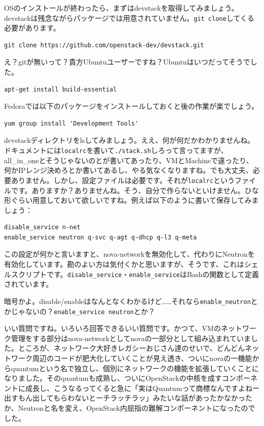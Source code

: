\documentclass[9pt,b5paper,tombo,openany,dvipdfmx]{jsbook}
\begin{document}
OSのインストールが終わったら、まずはdevstackを取得してみましょう。devstackは残念ながらパッケージでは用意されていません。\verb|git clone|してくる必要があります。

\begin{lstlisting}
git clone https://github.com/openstack-dev/devstack.git
\end{lstlisting}


え？gitが無いって？貴方Ubuntuユーザーですね？Ubuntuはいつだってそうでした。

\begin{lstlisting}
apt-get install build-essential
\end{lstlisting}

Fedoraでは以下のパッケージをインストールしておくと後の作業が楽でしょう。

\begin{lstlisting}
yum group install 'Development Tools'
\end{lstlisting}

devstackディレクトリをlsしてみましょう。ええ、何が何だかわかりませんね。ドキュメントには\verb|localrc|を書いて\verb|./stack.sh|しろって言ってますが、all\_in\_oneとそうじゃないのとが書いてあったり、VMとMachineで違ったり、何かIPレンジ決めろとか書いてあるし、やる気なくなりますね。でも大丈夫、必要ありません。しかし、設定ファイルは必要です。それが\verb|localrc|というファイルです。ありますか？ありませんね。そう、自分で作らないといけません。ひな形ぐらい用意しておいて欲しいですね。例えば以下のように書いて保存してみましょう：

\begin{lstlisting}
disable_service n-net
enable_service neutron q-svc q-agt q-dhcp q-l3 q-meta
\end{lstlisting}

この設定が何かと言いますと、nova-networkを無効化して、代わりにNeutronを有効化しています。勘のよい方は気付くかと思いますが、そうです、これはシェルスクリプトです。\verb|disable_service|・\verb|enable_service|はBashの関数として定義されています。

暗号かよ。disable/enableはなんとなくわかるけど……それなら\verb|enable_neutron|とかじゃないの？\verb|enable_service neutron|とか？

いい質問ですね。いろいろ回答できるいい質問です。かつて、VMのネットワーク管理をする部分はnova-networkとしてnovaの一部分として組み込まれていました。ところが、ネットワーク大好きレガシーおじさん達のせいで、どんどんネットワーク周辺のコードが肥大化していくことが見え透き、ついにnovaの一機能からquantumという名で独立し、個別にネットワークの機能を拡張していくことになりました。そのquantumも成熟し、ついにOpenStackの中核を成すコンポーネントに成長し、こうなるってくると急に「実はQuantumって商標なんですよねー出すもん出してもらわないとーチラッチラッ」みたいな話があったかなかったか、Neutronと名を変え、OpenStack内屈指の難解コンポーネントになったのでした。
\end{document}
